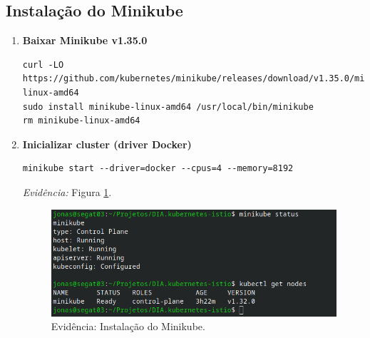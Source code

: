 \documentclass[12pt,a4paper]{report}
\begin{document}
\subsection{Instalação do Minikube}
\begin{enumerate}
\item\textbf{Baixar Minikube v1.35.0} \cite{minikube}

\begin{lstlisting}[style=shell]
curl -LO https://github.com/kubernetes/minikube/releases/download/v1.35.0/minikube-linux-amd64
sudo install minikube-linux-amd64 /usr/local/bin/minikube
rm minikube-linux-amd64
\end{lstlisting}

\item\textbf{Inicializar cluster (driver Docker)}
\begin{lstlisting}[style=shell]
minikube start --driver=docker --cpus=4 --memory=8192
\end{lstlisting}
\textit{Evidência:} Figura \ref{fig:minikube}.\\

\begin{figure}[h]
    \centering
    \includegraphics[width=1\linewidth]{figures/evidence-minikube.png}
    \caption{Evidência: Instalação do Minikube.}
    \label{fig:minikube}
\end{figure}
\end{enumerate}
\end{document}
